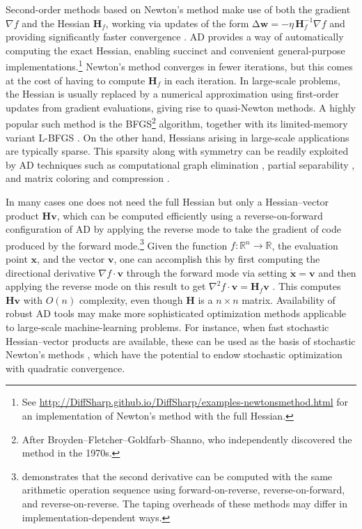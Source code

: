 \documentclass[twoside,11pt]{article}
\newcommand{\Del}{\mathrm{\Delta}}
\begin{document}
Second-order methods based on Newton's method make use of both the gradient $\nabla f$ and the Hessian $\mathbf{H}_f$, working via updates of the form $\Del \mathbf{w} = -\eta\,\mathbf{H}^{-1}_f \nabla f$ and providing significantly faster convergence \citep{Press2007}. AD provides a way of automatically computing the exact Hessian, enabling succinct and convenient general-purpose implementations.\footnote{See \url{http://DiffSharp.github.io/DiffSharp/examples-newtonsmethod.html} for an implementation of Newton's method with the full Hessian.} Newton's method converges in fewer iterations, but this comes at the cost of having to compute $\mathbf{H}_f$ in each iteration. In large-scale problems, the Hessian is usually replaced by a numerical approximation using first-order updates from gradient evaluations, giving rise to quasi-Newton methods. A highly popular such method is the BFGS\footnote{After Broyden–Fletcher–Goldfarb–Shanno, who independently discovered the method in the 1970s.} algorithm, together with its limited-memory variant L-BFGS \citep{Dennis1996}. On the other hand, Hessians arising in large-scale applications are typically sparse. This sparsity along with symmetry can be readily exploited by AD techniques such as computational graph elimination \citep{Dixon1991}, partial separability \citep{Gay1996}, and matrix coloring and compression \citep{Gebremedhin2009}.

In many cases one does not need the full Hessian but only a Hessian--vector product $\mathbf{H} \mathbf{v}$, which can be computed efficiently using a reverse-on-forward configuration of AD by applying the reverse mode to take the gradient of code produced by the forward mode.\footnote{\citet{Christianson2012ALN} demonstrates that the second derivative can be computed with the same arithmetic operation sequence using forward-on-reverse, reverse-on-forward, and reverse-on-reverse. The taping overheads of these methods may differ in implementation-dependent ways.} Given the function $f:\mathbb{R}^n\to\mathbb{R}$, the evaluation point $\mathbf{x}$, and the vector $\mathbf{v}$, one can accomplish this by first computing the directional derivative $\nabla f \cdot \mathbf{v}$ through the forward mode via setting $\dot{\mathbf{x}}=\mathbf{v}$ and then applying the reverse mode on this result to get $\nabla^2 f \cdot \mathbf{v}=\mathbf{H}_f \mathbf{v}$ \citep{Pearlmutter1994}. This computes $\mathbf{H} \mathbf{v}$ with $O(n)$ complexity, even though $\mathbf{H}$ is a $n \times n$ matrix. Availability of robust AD tools may make more sophisticated optimization methods applicable to large-scale machine-learning problems.  For instance, when fast stochastic Hessian--vector products are available, these can be used as the basis of stochastic Newton's methods \citep{agarwal2016second}, which have the potential to endow stochastic optimization with quadratic convergence.
\end{document}
